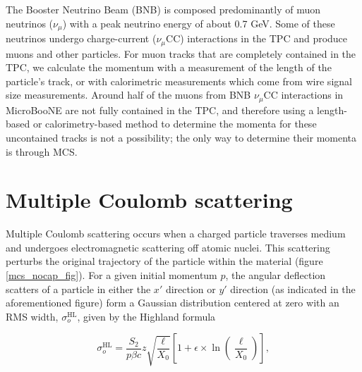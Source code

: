 \documentclass[a4paper,11pt]{article}
\begin{document}
The Booster Neutrino Beam (BNB) is composed predominantly of muon neutrinos ($\nu_\mu$) with a peak neutrino energy of about 0.7 GeV. Some of these neutrinos undergo charge-current ($\nu_\mu$CC) interactions in the TPC and produce muons and other particles. For muon tracks that are completely contained in the TPC, we calculate the momentum with a measurement of the length of the particle's track, or with calorimetric measurements which come from wire signal size measurements. Around half of the muons from BNB $\nu_\mu$CC interactions in MicroBooNE are not fully contained in the TPC, and therefore using a length-based or calorimetry-based method to determine the momenta for these uncontained tracks is not a possibility; the only way to determine their momenta is through MCS. \\

\section{Multiple Coulomb scattering}

Multiple Coulomb scattering occurs when a charged particle traverses medium and undergoes electromagnetic scattering off atomic nuclei. This scattering perturbs the original trajectory of the particle within the material (figure \ref{mcs_nocap_fig}). For a given initial momentum $p$, the angular deflection scatters of a particle in either the $x'$ direction or $y'$ direction (as indicated in the aforementioned figure) form a Gaussian distribution centered at zero with an RMS width, $\sigma_o^{\text{HL}}$, given by the Highland formula \cite{highland}\cite{highland-lynch-dahl} 

\begin{equation}\label{highland_eqtn}
	\sigma_o^{\text{HL}}=\frac{S_2}{p\beta c}z\sqrt{\frac{\ell}{X_0}}\left[1+\epsilon\times\ln\left(\frac{\ell}{X_0}\right)\right],
\end{equation}
\end{document}
